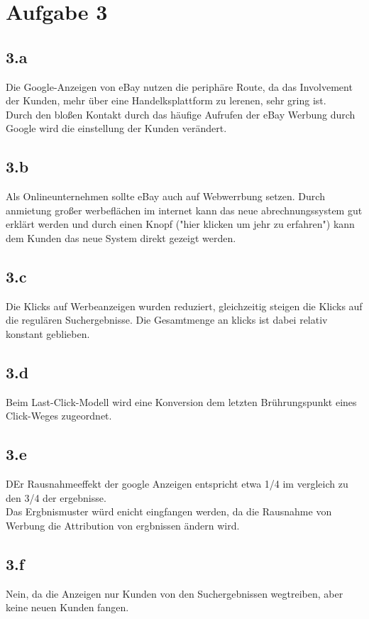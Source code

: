 \section{Aufgabe 3}
\subsection{3.a}
    Die Google-Anzeigen von eBay nutzen die periphäre Route, da das Involvement der Kunden, mehr über eine Handelksplattform zu lerenen, sehr gring ist. \\
    Durch den bloßen Kontakt durch das häufige Aufrufen der eBay Werbung durch Google wird die einstellung der Kunden verändert.

\subsection{3.b}
    Als Onlineunternehmen sollte eBay auch auf Webwerrbung setzen. Durch anmietung großer werbeflächen im internet kann das neue abrechnungssystem gut erklärt werden und durch einen Knopf ("hier klicken um jehr zu erfahren") kann dem Kunden das neue System direkt gezeigt werden.

\subsection{3.c}
    Die Klicks auf Werbeanzeigen wurden reduziert, gleichzeitig steigen die Klicks auf die regulären Suchergebnisse. Die Gesamtmenge an klicks ist dabei relativ konstant geblieben.

\subsection{3.d}
    Beim Last-Click-Modell wird eine Konversion dem letzten Brührungspunkt eines Click-Weges zugeordnet.

\subsection{3.e}
    DEr Rausnahmeeffekt der google Anzeigen entspricht etwa 1/4 im vergleich zu den 3/4 der ergebnisse. \\
    Das Ergbnismuster würd enicht eingfangen werden, da die Rausnahme von Werbung die Attribution von ergbnissen ändern wird.

\subsection{3.f}
    Nein, da die Anzeigen nur Kunden von den Suchergebnissen wegtreiben, aber keine neuen Kunden fangen.

